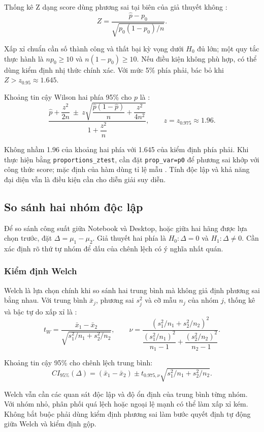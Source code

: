 Thống kê Z dạng score dùng phương sai tại biên của giả thuyết không \cite{ref3}:
\nopagebreak[4]
\[Z=\frac{\hat p-p_0}{\sqrt{p_0(1-p_0)/n}}.\]

Xấp xỉ chuẩn cần số thành công và thất bại kỳ vọng dưới \(H_0\) đủ lớn; một quy tắc thực hành là \(np_0\geq10\) và \(n(1-p_0)\geq10\). Nếu điều kiện không phù hợp, có thể dùng kiểm định nhị thức chính xác. Với mức 5\% phía phải, bác bỏ khi \(Z>z_{0.95}\approx1.645\).

Khoảng tin cậy Wilson hai phía 95\% cho \(p\) là \cite{ref4}:
\nopagebreak[4]
\[
\frac{\hat p+\dfrac{z^2}{2n}\ \pm\ z\sqrt{\dfrac{\hat p(1-\hat p)}{n}+\dfrac{z^2}{4n^2}}}
{1+\dfrac{z^2}{n}},\qquad z=z_{0.975}\approx1.96.
\]

Không nhầm 1.96 của khoảng hai phía với 1.645 của kiểm định phía phải. Khi thực hiện bằng \texttt{proportions\_ztest}, cần đặt \texttt{prop\_var=p0} để phương sai khớp với công thức score; mặc định của hàm dùng tỉ lệ mẫu \cite{ref4}. Tính độc lập và khả năng đại diện vẫn là điều kiện cần cho diễn giải suy diễn.

\subsection{So sánh hai nhóm độc lập}

Để so sánh công suất giữa Notebook và Desktop, hoặc giữa hai hãng được lựa chọn trước, đặt \(\Delta=\mu_1-\mu_2\). Giả thuyết hai phía là \(H_0:\Delta=0\) và \(H_1:\Delta\neq0\). Cần xác định rõ thứ tự nhóm để dấu của chênh lệch có ý nghĩa nhất quán.

\subsubsection{Kiểm định Welch}

Welch là lựa chọn chính khi so sánh hai trung bình mà không giả định phương sai bằng nhau. Với trung bình \(\bar x_j\), phương sai \(s_j^2\) và cỡ mẫu \(n_j\) của nhóm \(j\), thống kê và bậc tự do xấp xỉ là \cite{ref5}:
\nopagebreak[4]
\[t_W=\frac{\bar x_1-\bar x_2}{\sqrt{s_1^2/n_1+s_2^2/n_2}},\qquad
\nu=\frac{(s_1^2/n_1+s_2^2/n_2)^2}
{\dfrac{(s_1^2/n_1)^2}{n_1-1}+\dfrac{(s_2^2/n_2)^2}{n_2-1}}.\]

Khoảng tin cậy 95\% cho chênh lệch trung bình:
\nopagebreak[4]
\[CI_{95\%}(\Delta)=(\bar x_1-\bar x_2)\pm t_{0.975,\nu}\sqrt{s_1^2/n_1+s_2^2/n_2}.\]

Welch vẫn cần các quan sát độc lập và độ ổn định của trung bình từng nhóm. Với nhóm nhỏ, phân phối quá lệch hoặc ngoại lệ mạnh có thể làm xấp xỉ kém. Không bắt buộc phải dùng kiểm định phương sai làm bước quyết định tự động giữa Welch và kiểm định gộp.

